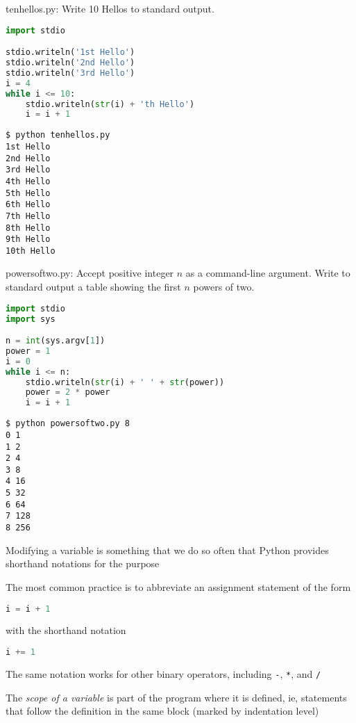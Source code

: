 \documentclass[8pt,a4paper,compress]{beamer}
\begin{document}
\begin{frame}[fragile]
\begin{framed}
\tiny tenhellos.py: Write 10 Hellos to standard output.
\end{framed}

\begin{lstlisting}[language=Python]
import stdio

stdio.writeln('1st Hello')
stdio.writeln('2nd Hello')
stdio.writeln('3rd Hello')
i = 4
while i <= 10:
    stdio.writeln(str(i) + 'th Hello')
    i = i + 1
\end{lstlisting}

\begin{lstlisting}[language={}]
$ python tenhellos.py 
1st Hello
2nd Hello
3rd Hello
4th Hello
5th Hello
6th Hello
7th Hello
8th Hello
9th Hello
10th Hello
\end{lstlisting}
\end{frame}

\begin{frame}[fragile]
\begin{framed}
\tiny powersoftwo.py: Accept positive integer $n$ as a command-line argument. Write to standard output a table showing the first $n$ powers of two.
\end{framed}

\begin{lstlisting}[language=Python]
import stdio
import sys

n = int(sys.argv[1])
power = 1
i = 0
while i <= n:
    stdio.writeln(str(i) + ' ' + str(power))    
    power = 2 * power
    i = i + 1
\end{lstlisting}

\begin{lstlisting}[language={}]
$ python powersoftwo.py 8
0 1
1 2
2 4
3 8
4 16
5 32
6 64
7 128
8 256
\end{lstlisting}
\end{frame}

\begin{frame}[fragile]
Modifying a variable is something that we do so often that Python provides shorthand notations for the purpose

\bigskip

The most common practice is to abbreviate an assignment statement of the form 

\begin{lstlisting}[language=Python]
i = i + 1
\end{lstlisting}

with the shorthand notation

\begin{lstlisting}[language=Python]
i += 1
\end{lstlisting}

\bigskip

The same notation works for other binary operators, including \lstinline{-}, \lstinline{*}, and \lstinline{/}

\bigskip

The \emph{scope of a variable} is part of the program where it is defined, ie, statements that follow the definition in the same block (marked by indentation level)
\end{frame}
\end{document}
